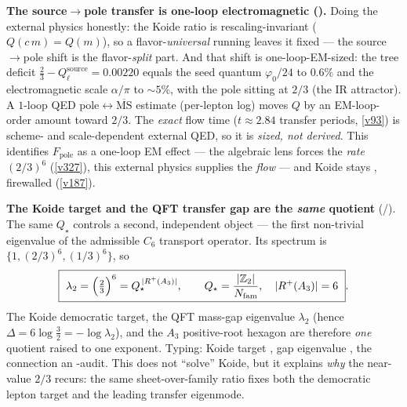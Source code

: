 \par\smallskip\noindent\textbf{The source$\to$pole transfer is one-loop electromagnetic
().} Doing the external physics honestly: the Koide ratio is
rescaling-invariant ($Q(c\,m)=Q(m)$), so a flavor-\emph{universal} running leaves it fixed --- the
source$\to$pole shift is the flavor-\emph{split} part. And that shift is one-loop-EM-sized: the tree
deficit $\tfrac23-Q_\ell^{\mathrm{source}}=0.00220$ equals the seed quantum $\varphi_0/24$ to $0.6\%$ and
the electromagnetic scale $\alpha/\pi$ to ${\sim}5\%$, with the pole sitting at $2/3$ (the IR attractor).
A $1$-loop QED $\mathrm{pole}\!\leftrightarrow\!\overline{\mathrm{MS}}$ estimate (per-lepton log) moves $Q$
by an EM-loop-order amount toward $2/3$. The \emph{exact} flow time ($t\approx2.84$ transfer periods,
\vref{v93}) is scheme- and scale-dependent external QED, so it is \emph{sized, not derived}. This
identifies $F_{\mathrm{pole}}$ as a one-loop EM effect --- the algebraic lens forces the \emph{rate}
$(2/3)^6$ (\vref{v327}), this external physics supplies the \emph{flow} --- and Koide stays \mC,
firewalled (\vref{v187}).

\par\smallskip\noindent\textbf{The Koide target and the QFT transfer gap are the \emph{same} quotient} (\mE/\mC).
The same $Q_\star$ controls a second, independent object --- the first non-trivial eigenvalue of the
admissible $C_6$ transport operator. Its spectrum is $\{1,(2/3)^6,(1/3)^6\}$, so
\[
  \boxed{\ \lambda_2=\Bigl(\tfrac23\Bigr)^6=Q_\star^{\,|R^+(A_3)|},\qquad Q_\star=\frac{|\Z_2|}{\Nfam},\quad |R^+(A_3)|=6\ }.
\]
The Koide democratic target, the QFT mass-gap eigenvalue $\lambda_2$ (hence $\Delta=6\log\tfrac32=-\log\lambda_2$),
and the $A_3$ positive-root hexagon are therefore \emph{one} quotient raised to one exponent. Typing:
Koide target \mC, gap eigenvalue \mE, the connection an \mE-audit. This does not ``solve'' Koide, but it
explains \emph{why} the near-value $2/3$ recurs: the same sheet-over-family ratio fixes both the
democratic lepton target and the leading transfer eigenmode.

